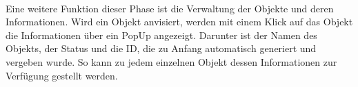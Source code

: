 \\
Eine weitere Funktion dieser Phase ist die Verwaltung der Objekte und deren Informationen. Wird ein Objekt anvisiert, werden mit einem Klick auf das Objekt 
die Informationen über ein PopUp angezeigt. Darunter ist der Namen des Objekts, der Status und die ID, die zu Anfang automatisch generiert 
und vergeben wurde. So kann zu jedem einzelnen Objekt dessen Informationen zur Verfügung gestellt werden. 
\begin{figure}[hbt!]
    \centering

\end{figure}

